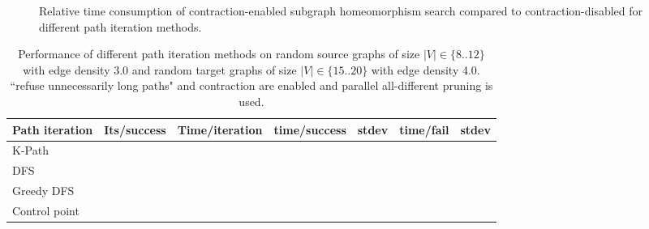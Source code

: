\begin{figure}
    \caption{Relative time consumption of contraction-enabled subgraph homeomorphism search compared to contraction-disabled for different path iteration methods.}
    \label{fig:contractionsmall}
\end{figure}









\begin{table}[ht]
\centering
\begin{tabular}{|l|l|l|l|l|l|l|}
\hline
\textbf{Path iteration} &
  \textbf{Its/success} &
  \textbf{Time/iteration} &
  \textbf{time/success} &
  \textbf{stdev} &
  \textbf{time/fail} &
  \textbf{stdev} \\ \hline
K-Path        &  &  &  &  &  &  \\ \hline
DFS           &  &  &  &  &  &  \\ \hline
Greedy DFS    &  &  &  &  &  &  \\ \hline
Control point &  &  &  &  &  &  \\ \hline
\end{tabular}
\caption{Performance of different path iteration methods on random source graphs of size $|V|\in \{8..12\}$ with edge density 3.0 and random target graphs of size $|V|\in \{15..20\}$ with edge density 4.0. ``refuse unnecessarily long paths" and contraction are enabled and parallel all-different pruning is used.}
\label{tab:iterator-performance}
\end{table}




